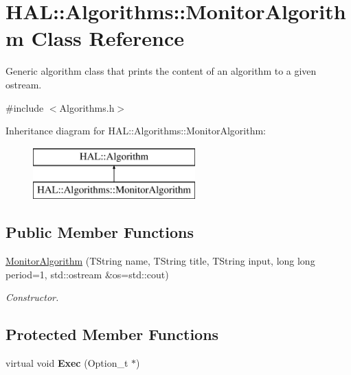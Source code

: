 \hypertarget{class_h_a_l_1_1_algorithms_1_1_monitor_algorithm}{\section{H\-A\-L\-:\-:Algorithms\-:\-:Monitor\-Algorithm Class Reference}
\label{class_h_a_l_1_1_algorithms_1_1_monitor_algorithm}
}


Generic algorithm class that prints the content of an algorithm to a given ostream.  




{\ttfamily \#include $<$Algorithms.\-h$>$}

Inheritance diagram for H\-A\-L\-:\-:Algorithms\-:\-:Monitor\-Algorithm\-:\begin{figure}[H]
\begin{center}
\leavevmode
\includegraphics[height=2.000000cm]{class_h_a_l_1_1_algorithms_1_1_monitor_algorithm}
\end{center}
\end{figure}
\subsection*{Public Member Functions}
\begin{DoxyCompactItemize}
\item 
\hyperlink{class_h_a_l_1_1_algorithms_1_1_monitor_algorithm_ac37ea6c50b23dbb49b63d9fe551554a7}{Monitor\-Algorithm} (T\-String name, T\-String title, T\-String input, long long period=1, std\-::ostream \&os=std\-::cout)
\begin{DoxyCompactList}\small\item\em Constructor. \end{DoxyCompactList}\end{DoxyCompactItemize}
\subsection*{Protected Member Functions}
\begin{DoxyCompactItemize}
\item 
\hypertarget{class_h_a_l_1_1_algorithms_1_1_monitor_algorithm_ae1efc679e7dcbc8692a6b37dca0517c3}{virtual void {\bfseries Exec} (Option\-\_\-t $\ast$)}\label{class_h_a_l_1_1_algorithms_1_1_monitor_algorithm_ae1efc679e7dcbc8692a6b37dca0517c3}

\end{DoxyCompactItemize}
